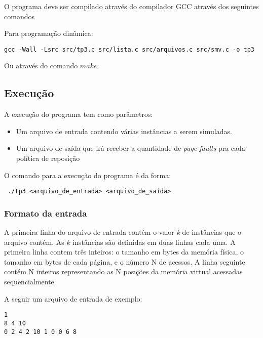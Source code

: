 \documentclass[12pt]{article}
\begin{document}
O programa deve ser compilado através do compilador GCC através dos seguintes comandos

Para programação dinâmica:
\begin{footnotesize}
\begin{verbatim}
gcc -Wall -Lsrc src/tp3.c src/lista.c src/arquivos.c src/smv.c -o tp3 \end{verbatim}
\end{footnotesize}

Ou através do comando $make$.

\subsection{Execução}

A execução do programa tem como parâmetros:
\begin{itemize}
\item Um arquivo de entrada contendo várias instâncias a serem simuladas.
\item Um arquivo de saída que irá receber a quantidade de \textit{page faults} pra cada política de reposição
\end{itemize}

O comando para a execução do programa é da forma:

\begin{footnotesize}
\begin{verbatim} ./tp3 <arquivo_de_entrada> <arquivo_de_saída>\end{verbatim}
\end{footnotesize}


\subsubsection{Formato da entrada}
\label{entrada}

A primeira linha do arquivo de entrada contém o valor \textit{k} de instâncias que o arquivo contém. As $k$ instâncias são definidas em duas linhas cada uma. A primeira linha contem três inteiros: o tamanho em bytes da memória física, o tamanho em bytes de cada página, e o número N de acessos. A linha seguinte contém N inteiros representando as N posições da memória virtual acessadas sequencialmente.

A seguir um arquivo de entrada de exemplo:

\begin{verbatim}
1
8 4 10
0 2 4 2 10 1 0 0 6 8
\end{verbatim}
\end{document}
